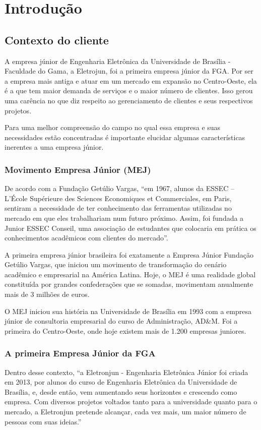 \chapter[Introdução]{Introdução}
  \section{Contexto do cliente}
A empresa júnior de Engenharia Eletrônica da Universidade de Brasília - Faculdade do Gama, a Eletrojun, foi a primeira empresa júnior da FGA. Por ser a empresa mais antiga e atuar em um mercado em expansão no Centro-Oeste, ela é a que tem maior demanda de serviços e o maior número de clientes. Isso gerou uma carência no que diz respeito ao gerenciamento de clientes e seus respectivos projetos.

Para uma melhor compreensão do campo no qual essa empresa e suas necessidades estão concentradas é importante elucidar algumas características inerentes a uma empresa júnior.

\subsection{Movimento Empresa Júnior (MEJ)}
De acordo com a Fundação Getúlio Vargas, “em 1967, alunos da ESSEC – L’École Supérieure des Sciences Economiques et Commerciales, em Paris, sentiram a necessidade de ter conhecimento das ferramentas utilizadas no mercado em que eles trabalhariam num futuro próximo. Assim, foi fundada a Junior ESSEC Conseil, uma associação de estudantes que colocaria em prática os conhecimentos acadêmicos com clientes do mercado”.

A primeira empresa júnior brasileira foi exatamente a Empresa Júnior Fundação Getúlio Vargas, que iniciou um movimento de transformação do cenário acadêmico e empresarial na América Latina. Hoje, o MEJ é uma realidade global constituída por grandes confederações que se somadas, movimentam anualmente mais de 3 milhões de euros.

O MEJ iniciou sua história na Universidade de Brasília em 1993 com a empresa júnior de consultoria empresarial do curso de Administração, AD\&M. Foi a primeira do Centro-Oeste, onde hoje existem mais de 1.200 empresas juniores.

\subsection{A primeira Empresa Júnior da FGA}
Dentro desse contexto, “a Eletronjun - Engenharia Eletrônica Júnior foi criada em 2013, por alunos do curso de Engenharia Eletrônica da Universidade de Brasília, e, desde então, vem aumentando seus horizontes e crescendo como empresa. Com diversos projetos voltados tanto para a universidade quanto para o mercado, a Eletronjun pretende alcançar, cada vez mais, um maior número de pessoas com suas ideias.”

